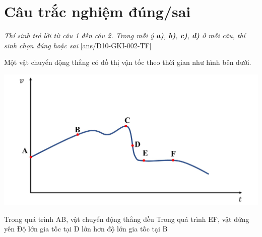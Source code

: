 \section{Câu trắc nghiệm đúng/sai} 
\textit{Thí sinh trả lời từ câu 1 đến câu 2. Trong mỗi ý \textbf{a)}, \textbf{b)}, \textbf{c)}, \textbf{d)} ở mỗi câu, thí sinh chọn đúng hoặc sai}
\setcounter{ex}{0}
[ans/D10-GKI-002-TF]
\begin{ex}
	Một vật chuyển động thẳng có đồ thị vận tốc theo thời gian như hình bên dưới.
	\begin{center}
		\includegraphics[width=0.7\linewidth]{../figs/D10-2-8}
	\end{center}
	{Trong quá trình AB, vật chuyển động thẳng đều}
	{Trong quá trình EF, vật đứng yên}
	{\True Độ lớn gia tốc tại D lớn hơn độ lớn gia tốc tại B}
\end{ex}

